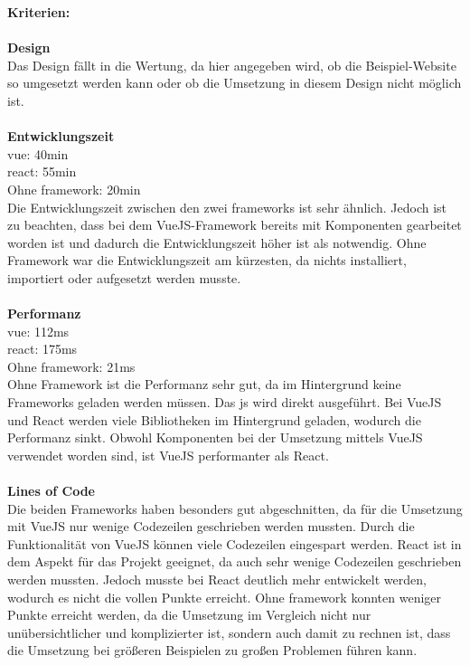 \textbf{Kriterien:}\\\\
\textbf{Design}\\
Das Design fällt in die Wertung, da hier angegeben wird, ob die Beispiel-Website so umgesetzt werden kann oder ob die Umsetzung in diesem Design nicht möglich ist.\\\\
\newpage
\textbf{Entwicklungszeit}\\
\Gls{vue}: 40min\\
\Gls{react}: 55min\\
Ohne \Gls{framework}: 20min\\
Die Entwicklungszeit zwischen den zwei \Gls{framework}s ist sehr ähnlich. Jedoch ist zu beachten, dass bei dem VueJS-Framework bereits mit Komponenten gearbeitet worden ist und dadurch die Entwicklungszeit höher ist als notwendig. Ohne Framework war die Entwicklungszeit am kürzesten, da nichts installiert, importiert oder aufgesetzt werden musste.\\\\
\textbf{Performanz}\\
\Gls{vue}: 112ms\\
\Gls{react}: 175ms\\
Ohne \Gls{framework}: 21ms\\
Ohne Framework ist die Performanz sehr gut, da im Hintergrund keine Frameworks geladen werden müssen. Das \Gls{js} wird direkt ausgeführt. Bei VueJS und React werden viele Bibliotheken im Hintergrund geladen, wodurch die Performanz sinkt. Obwohl Komponenten bei der Umsetzung mittels VueJS verwendet worden sind, ist VueJS performanter als React.\\\\
\textbf{Lines of Code}\\
Die beiden Frameworks haben besonders gut abgeschnitten, da für die Umsetzung mit VueJS nur wenige Codezeilen geschrieben werden mussten. Durch die Funktionalität von VueJS können viele Codezeilen eingespart werden. React ist in dem Aspekt für das Projekt geeignet, da auch sehr wenige Codezeilen geschrieben werden mussten. Jedoch musste bei React deutlich mehr entwickelt werden, wodurch es nicht die vollen Punkte erreicht.
Ohne \Gls{framework} konnten weniger Punkte erreicht werden, da die Umsetzung im Vergleich nicht nur unübersichtlicher und komplizierter ist, sondern auch damit zu rechnen ist, dass die Umsetzung bei größeren Beispielen zu großen Problemen führen kann.
\newpage
